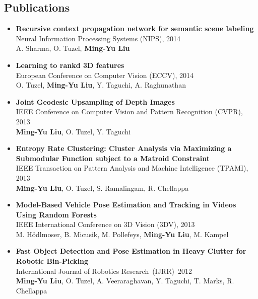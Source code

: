 \documentclass[10pt,letterpaper]{article}
\begin{document}
\subsection*{Publications}
\begin{itemize}
\item           {\bf Recursive context propagation network for semantic scene labeling}\\
                Neural Information Processing Systems (NIPS), 2014\\
                A. Sharma, O. Tuzel, {\bf Ming-Yu Liu}\vspace{-2mm}
                
\item           {\bf Learning to rankd 3D features}\\
                European Conference on Computer Vision (ECCV), 2014\\
                O. Tuzel, {\bf Ming-Yu Liu}, Y. Taguchi, A. Raghunathan\vspace{-2mm}
                
\item           {\bf Joint Geodesic Upsampling of Depth Images}\\
                IEEE Conference on Computer Vision and Pattern Recognition (CVPR), 2013\\
                {\bf Ming-Yu Liu}, O. Tuzel, Y. Taguchi\vspace{-2mm}
                
\item           {\bf Entropy Rate Clustering: Cluster Analysis via Maximizing a Submodular Function subject to a Matroid Constraint}\\
                IEEE Transaction on Pattern Analysis and Machine Intelligence (TPAMI), 2013\\
                {\bf Ming-Yu Liu}, O. Tuzel, S. Ramalingam, R. Chellappa\vspace{-2mm}
                
\item           {\bf Model-Based Vehicle Pose Estimation and Tracking in Videos Using Random Forests}\\
                IEEE International Conference on 3D Vision (3DV), 2013\\
                M. Hödlmoser, B. Micusik, M. Pollefeys, {\bf Ming-Yu Liu}, M. Kampel\vspace{-2mm}          
                
\item           {\bf Fast Object Detection and Pose Estimation in Heavy Clutter for Robotic Bin-Picking}\\
                International Journal of Robotics Research~(IJRR)~2012\\
                {\bf Ming-Yu Liu}, O. Tuzel, A. Veeraraghavan, Y. Taguchi, T. Marks, R. Chellappa\vspace{-2mm}
                

\end{itemize}
\end{document}
